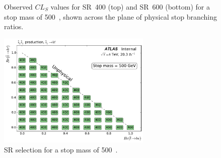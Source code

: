 \begin{figure}[ht]
  \centering
  \caption{
    Observed
    $CL_S$ values for SR~400 (top) and SR~600 (bottom) for a stop mass of
    500~\GeV,
    shown across the plane of physical stop branching ratios.
  }
\end{figure}

\begin{figure}[ht]
  \centering
  \includegraphics[width=0.65\textwidth]
    {figs/blstop/region_selection/region_choice_vs_br_m_500.pdf}
  \caption{
    SR selection for a stop mass of 500~\GeV.
  }
\end{figure}

